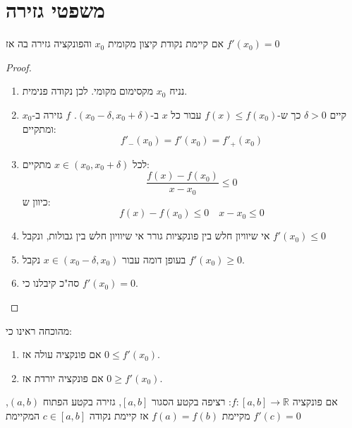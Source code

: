 \documentclass{tstextbook}
\begin{document}
\section{משפטי גזירה}

\begin{theorem}[פרמה]
אם קיימת נקודת קיצון מקומית \(x_0\) והפונקציה גזירה בה אז \(f'(x_0)=0\)

\end{theorem}
\begin{proof}
  \begin{enumerate}
    \item נניח \(x_{0}\) מקסימום מקומי. לכן נקודה פנימית. 


    \item קיים \(\delta>0\) כך ש-\(f(x)\leq f(x_{0})\) עבור כל \(x\) ב-\(\left( x_{0}-\delta,x_{0}+\delta \right)\). \(f\) גזירה ב-\(x_{0}\) ומתקיים: 
$$f'_{-}(x_{0})=f'(x_{0})=f'_{+}(x_{0})$$


    \item לכל \(x \in \left( x_{0},x_{0}+\delta \right)\) מתקיים: 
$$\frac{f(x)-f(x_{0})}{x-x_{0}}\leq 0$$
כיוון ש:
$$f(x)-f(x_{0})\leq 0\quad x-x_{0}\leq 0$$


    \item אי שיוויון חלש בין פונקציות גורר אי שיוויון חלש בין גבולות, ונקבל \(f'(x_{0})\leq 0\)


    \item בעופן דומה עבור \(x \in \left( x_{0}-\delta,x_{0} \right)\) נקבל \(f'(x_{0})\geq 0\). 


    \item סה"כ קיבלנו כי \(f'(x_{0})=0\). 


  \end{enumerate}
\end{proof}
\begin{corollary}
מהוכחה ראינו כי:

  \begin{enumerate}
    \item אם פונקציה עולה אז \(0\leq f'(x_{0})\). 


    \item אם פונקציה יורדת אז \(0\geq f'(x_{0})\). 


  \end{enumerate}
\end{corollary}
\begin{theorem}[רול]
אם פונקציה \(f:[a,b] \rightarrow \mathbb R\):
 רציפה בקטע הסגור \([a,b]\), גזירה בקטע הפתוח \((a,b)\), מקיימת \(f(a)=f(b)\)
אז קיימת נקודה \(c\in [a,b]\) המקיימת \(f'(c)=0\)

\end{theorem}
\end{document}
